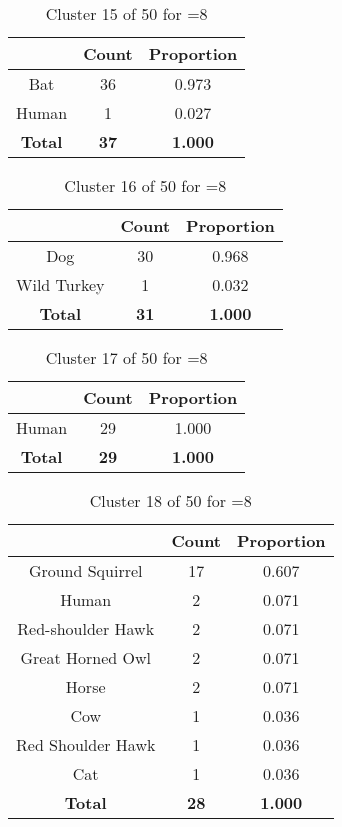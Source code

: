 \begin{table}[ht!]
\centering
\begin{tabular}{|c|c|c|}
\hline
\bf \Spec{} &\bf Count &\bf Proportion\\ \hline \hline
Bat & 36 & 0.973\\ \hline
Human & 1 & 0.027\\ \hline
\hline
\bf Total & \bf 37 & \bf 1.000\\ \hline
\end{tabular}
\label{tab:cluster:15:8}
\caption{Cluster 15 of 50 for \minneigh{}=8}
\end{table}

\begin{table}[ht!]
\centering
\begin{tabular}{|c|c|c|}
\hline
\bf \Spec{} &\bf Count &\bf Proportion\\ \hline \hline
Dog & 30 & 0.968\\ \hline
Wild Turkey & 1 & 0.032\\ \hline
\hline
\bf Total & \bf 31 & \bf 1.000\\ \hline
\end{tabular}
\label{tab:cluster:16:8}
\caption{Cluster 16 of 50 for \minneigh{}=8}
\end{table}

\begin{table}[ht!]
\centering
\begin{tabular}{|c|c|c|}
\hline
\bf \Spec{} &\bf Count &\bf Proportion\\ \hline \hline
Human & 29 & 1.000\\ \hline
\hline
\bf Total & \bf 29 & \bf 1.000\\ \hline
\end{tabular}
\label{tab:cluster:17:8}
\caption{Cluster 17 of 50 for \minneigh{}=8}
\end{table}

\begin{table}[ht!]
\centering
\begin{tabular}{|c|c|c|}
\hline
\bf \Spec{} &\bf Count &\bf Proportion\\ \hline \hline
Ground Squirrel & 17 & 0.607\\ \hline
Human & 2 & 0.071\\ \hline
Red-shoulder Hawk & 2 & 0.071\\ \hline
Great Horned Owl & 2 & 0.071\\ \hline
Horse & 2 & 0.071\\ \hline
Cow & 1 & 0.036\\ \hline
Red Shoulder Hawk & 1 & 0.036\\ \hline
Cat & 1 & 0.036\\ \hline
\hline
\bf Total & \bf 28 & \bf 1.000\\ \hline
\end{tabular}
\label{tab:cluster:18:8}
\caption{Cluster 18 of 50 for \minneigh{}=8}
\end{table}

